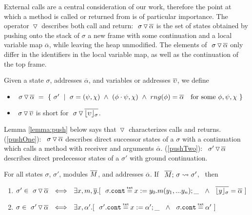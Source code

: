 {{External calls are a central consideration of our work, therefore  the point at which a method is called or returned from is of particular importance. 
The operator $\, {\triangledown}\,$ describes both call and return:
 $  \ {\sigma} \, {\triangledown}\, \overline{\alpha}  $ is  the set of states obtained by pushing onto the stack of $\sigma$ a new frame with some continuation  and a local variable map  $\overline \alpha$, while leaving the heap unmodified.
The elements of $  \ {\sigma} \, {\triangledown}\, \overline{\alpha}  $ only differ in the identifiers in the local variable map, as well as the continuation  of the top frame. 
}

\begin{definition}
\label{def:push:frame}
Given a state $\sigma$, addresses $\overline \alpha$, and variables or addresses $\overline {\upsilon}$, we define
\begin{itemize}
\item
$ \PushS  {\alpha} {\sigma} \ =\ \{ \ \sigma' \ \mid\ \sigma=(\psi, \chi)\  \wedge\  (\phi\cdot \psi, \chi) \ \wedge\ rng(\phi)=\overline \alpha \ \ \mbox{ for some } \phi, \psi, \chi \ \}$
\item
{$  \ {\sigma} \, {\triangledown}\, \overline{\upsilon} $ is short for  $  \ {\sigma} \, {\triangledown}\, \overline{\lfloor \upsilon \rfloor_{\sigma}}  $.}
\end{itemize}
\end{definition}

 {Lemma \ref{lemma:push} below says that  $\, {\triangledown}\,$ characterizes  calls and returns.  (\ref{pushOne}):\ $  \ {\sigma} \, {\triangledown}\, \overline{\alpha} $ describes    direct successor states of  a $\sigma$ with a continuation which calls a method with receiver and arguments $\overline \alpha$. 
 (\ref{pushTwo}):\ $  \ {\sigma'} \, {\triangledown}\, \overline{\alpha} $  describes direct predecessor states of  a $\sigma'$ with ground continuation.}
  
\begin{lemma}%
\label{lemma:push}
For all states $\sigma$, $\sigma'$, modules $\overline{M}$, and addresses $\overline \alpha$. If \ $\overline{M};\, \sigma \leadsto {\sigma'} $, \ then 
\begin{enumerate}
\item
\label{pushOne}
$\sigma'\in   \PushS  {\alpha} {\sigma}  \ \ \Longleftrightarrow \ \ 
\exists x, m, \overline{y}.[\ \ \sigma.\prg{cont} \txteq x:=y_0.m(y_1,...y_n); \_\ \ \wedge \ \
{\overline { \interpret  \sigma y}} = \overline \alpha \ ] $
\item
\label{pushTwo}
$\sigma\in   \PushS  {\alpha} {\sigma'}  \ \ \Longleftrightarrow \ \ \exists x, \alpha'.[\ \  \sigma'.\prg{cont}\txteq x:=\alpha';\_ \ \ \wedge \ \  \sigma.\prg{cont}\txteq\alpha'\  ] $
\end{enumerate}


\end{lemma}}
